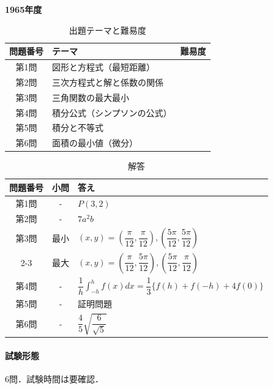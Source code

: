 \documentclass[../../main.tex]{subfiles}
\begin{document}
\begin{center}
  {\fontsize{48pt}{58pt}\selectfont \textbf{1965}\normalsize\textbf{年度}}
\end{center}

\begin{table}[htb]
  \centering
  \caption{出題テーマと難易度}
  \begin{tabular}{|c|p{9cm}|c|}
    \hline
    \textbf{問題番号} & \textbf{テーマ} & \textbf{難易度} \\
    \hline
    第1問 & 図形と方程式（最短距離） & \\
    \hline
    第2問 & 三次方程式と解と係数の関係 & \\
    \hline
    第3問 & 三角関数の最大最小 & \\
    \hline
    第4問 & 積分公式（シンプソンの公式） & \\
    \hline
    第5問 & 積分と不等式 & \\
    \hline
    第6問 & 面積の最小値（微分） & \\
    \hline
  \end{tabular}
\end{table}

\begin{table}[htb]
  \centering
  \caption{解答}
  \renewcommand{\arraystretch}{1.4}
  \begin{tabular}{|c|c|p{9cm}|}
    \hline
    \textbf{問題番号} & \textbf{小問} & \textbf{答え} \\
    \hline
    第1問 & - & $P(3,2)$ \\
    \hline
    第2問 & - & $7a^2b$ \\
    \hline
    第3問 & 最小 & $(x,y)=\left(\dfrac{\pi}{12},\dfrac{\pi}{12}\right),\left(\dfrac{5\pi}{12},\dfrac{5\pi}{12}\right)$ \\
    \cline{2-3}
    & 最大 & $(x,y)=\left(\dfrac{\pi}{12},\dfrac{5\pi}{12}\right),\left(\dfrac{5\pi}{12},\dfrac{\pi}{12}\right)$ \\
    \hline
    第4問 & - & $\dfrac{1}{h}\int_{-h}^h f(x)dx=\dfrac{1}{3}\{f(h)+f(-h)+4f(0)\}$ \\
    \hline
    第5問 & - & 証明問題 \\
    \hline
    第6問 & - & $\dfrac{4}{5}\sqrt{\dfrac{6}{\sqrt{5}}}$ \\
    \hline
  \end{tabular}
\end{table}

\paragraph{試験形態}
6問．試験時間は要確認．
\end{document}
